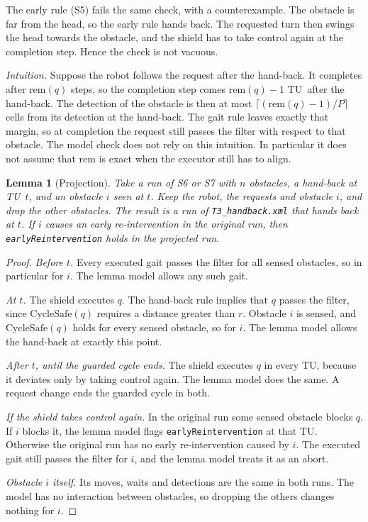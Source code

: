 \documentclass[11pt,a4paper]{article}
\newtheorem{lemma}{Lemma}
\theoremstyle{definition}
\newcommand{\tu}{TU}
\newcommand{\CycleSafe}{\mathrm{CycleSafe}}
\newcommand{\rem}{\mathrm{rem}}
\begin{document}
The early rule (S5) fails the same check, with a counterexample. The obstacle is far from the head, so the early rule hands back. The requested turn then swings the head towards the obstacle, and the shield has to take control again at the completion step. Hence the check is not vacuous.

\emph{Intuition.} Suppose the robot follows the request after the hand-back. It completes after $\rem(q)$ steps, so the completion step comes $\rem(q)-1$ \tu\ after the hand-back. The detection of the obstacle is then at most $\lceil(\rem(q)-1)/P\rceil$ cells from its detection at the hand-back. The gait rule leaves exactly that margin, so at completion the request still passes the filter with respect to that obstacle. The model check does not rely on this intuition. In particular it does not assume that $\rem$ is exact when the executor still has to align.

\begin{lemma}[Projection]\label{lem:projection}
Take a run of S6 or S7 with $n$ obstacles, a hand-back at \tu\ $t$, and an obstacle $i$ seen at $t$. Keep the robot, the requests and obstacle $i$, and drop the other obstacles. The result is a run of \texttt{T3\_handback.xml} that hands back at $t$. If $i$ causes an early re-intervention in the original run, then \texttt{earlyReintervention} holds in the projected run.
\end{lemma}

\begin{proof}
\emph{Before $t$.} Every executed gait passes the filter for all sensed obstacles, so in particular for $i$. The lemma model allows any such gait.

\emph{At $t$.} The shield executes $q$. The hand-back rule implies that $q$ passes the filter, since $\CycleSafe(q)$ requires a distance greater than $r$. Obstacle $i$ is sensed, and $\CycleSafe(q)$ holds for every sensed obstacle, so for $i$. The lemma model allows the hand-back at exactly this point.

\emph{After $t$, until the guarded cycle ends.} The shield executes $q$ in every \tu, because it deviates only by taking control again. The lemma model does the same. A request change ends the guarded cycle in both.

\emph{If the shield takes control again.} In the original run some sensed obstacle blocks $q$. If $i$ blocks it, the lemma model flags \texttt{earlyReintervention} at that \tu. Otherwise the original run has no early re-intervention caused by $i$. The executed gait still passes the filter for $i$, and the lemma model treats it as an abort.

\emph{Obstacle $i$ itself.} Its moves, waits and detections are the same in both runs. The model has no interaction between obstacles, so dropping the others changes nothing for $i$.
\end{proof}
\end{document}
